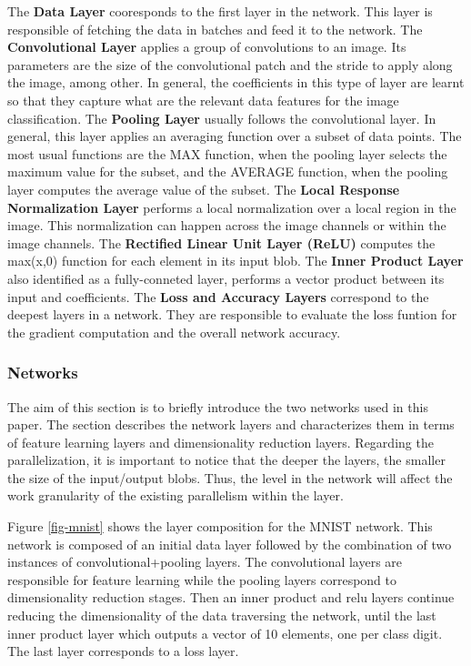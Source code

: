 The \textbf{Data Layer} cooresponds to the first layer in the 
network. This layer is responsible of fetching the data in batches and 
feed it to the network. The \textbf{Convolutional Layer} applies 
a group of convolutions to an image. Its parameters are the size of the 
convolutional patch and the stride to apply along the image, among other. 
In general, the coefficients in this type of layer are learnt so that 
they capture what are the relevant data features 
for the image classification. The \textbf{Pooling Layer} usually 
follows the convolutional layer. In general, this layer applies an averaging 
function over a subset of data points. The most usual functions are the 
MAX function, when the pooling layer selects the maximum value for the 
subset, and the AVERAGE function, when the pooling layer computes the average 
value of the subset. The \textbf{Local Response Normalization Layer} 
performs a local normalization over a local region in the image. 
This normalization can happen across the image channels or within the image 
channels. The \textbf{Rectified Linear Unit Layer (ReLU)} computes 
the max(x,0) function for each element in its input blob. 
The \textbf{Inner Product Layer} also identified as a fully-conneted layer, 
performs a vector product between its input and coefficients.  
The \textbf{Loss and Accuracy Layers} correspond 
to the deepest layers in a network. They are responsible to evaluate the 
loss funtion for the gradient computation and the overall network accuracy.

\subsubsection{Networks}
The aim of this section is to briefly introduce the two networks 
used in this paper. The section describes the network layers and characterizes 
them in terms of feature learning layers and dimensionality reduction 
layers. Regarding the parallelization, it is important to notice that 
the deeper the layers, the smaller the size of the input/output blobs. 
Thus, the level in the network will affect the work granularity of the 
existing parallelism within the layer. 

Figure \ref{fig-mnist} shows the layer composition for the MNIST network. 
This network is composed of an initial data layer followed by the 
combination of two instances of convolutional+pooling layers. The 
convolutional layers are responsible for feature learning while the 
pooling layers correspond to dimensionality reduction stages. 
Then an inner product and relu layers continue reducing the dimensionality 
of the data traversing the network, until the last inner product layer which 
outputs a vector of 10 elements, one per class digit. The last layer corresponds to a loss layer.

